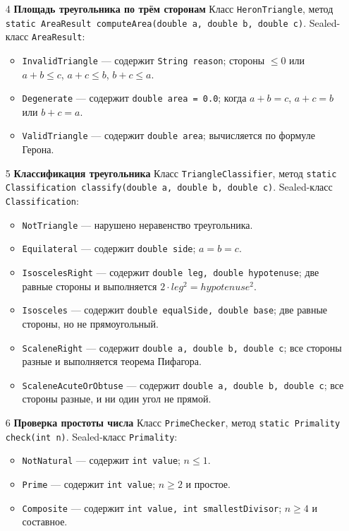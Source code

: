 \documentclass[12pt]{article}
\begin{document}
\begin{enumerate}
\item[4] \textbf{Площадь треугольника по трём сторонам}
Класс \texttt{HeronTriangle}, метод
\texttt{static AreaResult computeArea(double a, double b, double c)}.
Sealed-класс \texttt{AreaResult}:
\begin{itemize}
\item \texttt{InvalidTriangle} — содержит \texttt{String reason}; стороны \(\leq 0\) или \(a+b \leq c\), \(a+c \leq b\), \(b+c \leq a\).
\item \texttt{Degenerate} — содержит \texttt{double area = 0.0}; когда \(a + b = c\), \(a + c = b\) или \(b + c = a\).
\item \texttt{ValidTriangle} — содержит \texttt{double area}; вычисляется по формуле Герона.
\end{itemize}

\item[5] \textbf{Классификация треугольника}
Класс \texttt{TriangleClassifier}, метод
\texttt{static Classification classify(double a, double b, double c)}.
Sealed-класс \texttt{Classification}:
\begin{itemize}
\item \texttt{NotTriangle} — нарушено неравенство треугольника.
\item \texttt{Equilateral} — содержит \texttt{double side}; \(a = b = c\).
\item \texttt{IsoscelesRight} — содержит \texttt{double leg, double hypotenuse}; две равные стороны и выполняется \(2\cdot leg^2 = hypotenuse^2\).
\item \texttt{Isosceles} — содержит \texttt{double equalSide, double base}; две равные стороны, но не прямоугольный.
\item \texttt{ScaleneRight} — содержит \texttt{double a, double b, double c}; все стороны разные и выполняется теорема Пифагора.
\item \texttt{ScaleneAcuteOrObtuse} — содержит \texttt{double a, double b, double c}; все стороны разные, и ни один угол не прямой.
\end{itemize}

\item[6] \textbf{Проверка простоты числа}
Класс \texttt{PrimeChecker}, метод
\texttt{static Primality check(int n)}.
Sealed-класс \texttt{Primality}:
\begin{itemize}
\item \texttt{NotNatural} — содержит \texttt{int value}; \(n \leq 1\).
\item \texttt{Prime} — содержит \texttt{int value}; \(n \geq 2\) и простое.
\item \texttt{Composite} — содержит \texttt{int value, int smallestDivisor}; \(n \geq 4\) и составное.
\end{itemize}


\end{enumerate}
\end{document}

